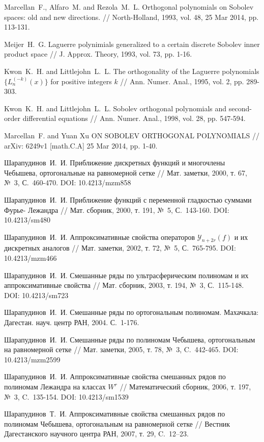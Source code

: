  Marcellan~F., Alfaro~M. and Rezola~M.~L. Orthogonal polynomials on Sobolev spaces: old and new directions. // North-Holland, 1993, vol. 48, 25 Mar 2014, pp. 113-131.

 Meijer~H.~G. Laguerre polynimials generalized to a certain discrete Sobolev inner product space // J. Approx. Theory, 1993, vol. 73, pp. 1-16.

 Kwon~K.~H.  and Littlejohn~L.~L. The orthogonality of the Laguerre polynomials $\{L_n^{(-k)}(x)\}$ for positive integers $k$ // Ann. Numer. Anal., 1995, vol. 2, pp. 289-303.

 Kwon~K.~H. and Littlejohn~L.~L. Sobolev orthogonal polynomials and second-order differential equations // Ann. Numer. Anal., 1998, vol. 28, pp. 547-594.

 Marcellan~F. and Yuan Xu ON SOBOLEV ORTHOGONAL POLYNOMIALS // arXiv: 6249v1 [math.C.A] 25 Mar 2014, pp. 1-40.

 Шарапудинов~И.~И. Приближение дискретных функций и многочлены Чебышева, ортогональные на равномерной сетке // Мат. заметки, 2000, т. 67, №~3, С.~460-470. DOI: 10.4213/mzm858

 Шарапудинов~И.~И. Приближение функций с переменной гладкостью суммами Фурье- Лежандра // Мат. сборник, 2000, т. 191, №~5, С.~143-160. DOI: 10.4213/sm480

 Шарапудинов~И.~И. Аппроксимативные свойства операторов $\mathcal{Y}_{n+2r}(f)$ и их дискретных аналогов // Мат. заметки, 2002, т. 72, №~5, С.~765-795. DOI: 10.4213/mzm466

 Шарапудинов~И.~И. Смешанные ряды по ультрасферическим полиномам и их аппроксимативные свойства // Мат. сборник, 2003, т. 194, №~3, С.~115-148. DOI: 10.4213/sm723

 Шарапудинов~И.~И. Смешанные ряды по ортогональным полиномам. Махачкала: Дагестан. науч. центр РАН, 2004. С.~1-176.

 Шарапудинов~И.~И. Смешанные ряды по полиномам Чебышева, ортогональным на равномерной сетке // Мат. заметки, 2005, т. 78, №~3, C.~442-465. DOI: 10.4213/mzm2599

 Шарапудинов~И.~И. Аппроксимативные свойства смешанных рядов по полиномам Лежандра на классах $W^r$ // Математический сборник, 2006, т. 197, №~3, C.~135-154. DOI: 10.4213/sm1539

 Шарапудинов~Т.~И. Аппроксимативные свойства смешанных рядов по полиномам Чебышева, ортогональным на равномерной сетке // Вестник Дагестанского научного центра РАН, 2007, т. 29, C.~12–23.

